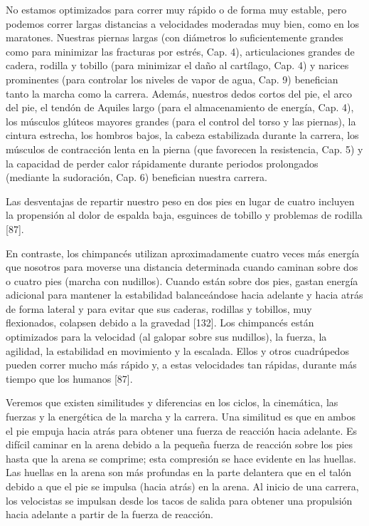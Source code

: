 \documentclass[12pt]{book}
\begin{document}
No estamos optimizados para correr muy rápido o de forma muy estable, pero podemos correr largas distancias a velocidades moderadas muy bien, como en los maratones. Nuestras piernas largas (con diámetros lo suficientemente grandes como para minimizar las fracturas por estrés, Cap. 4), articulaciones grandes de cadera, rodilla y tobillo (para minimizar el daño al cartílago, Cap. 4) y narices prominentes (para controlar los niveles de vapor de agua, Cap. 9) benefician tanto la marcha como la carrera. Además, nuestros dedos cortos del pie, el arco del pie, el tendón de Aquiles largo (para el almacenamiento de energía, Cap. 4), los músculos glúteos mayores grandes (para el control del torso y las piernas), la cintura estrecha, los hombros bajos, la cabeza estabilizada durante la carrera, los músculos de contracción lenta en la pierna (que favorecen la resistencia, Cap. 5) y la capacidad de perder calor rápidamente durante periodos prolongados (mediante la sudoración, Cap. 6) benefician nuestra carrera.

Las desventajas de repartir nuestro peso en dos pies en lugar de cuatro incluyen la propensión al dolor de espalda baja, esguinces de tobillo y problemas de rodilla [87].

En contraste, los chimpancés utilizan aproximadamente cuatro veces más energía que nosotros para moverse una distancia determinada cuando caminan sobre dos o cuatro pies (marcha con nudillos). Cuando están sobre dos pies, gastan energía adicional para mantener la estabilidad balanceándose hacia adelante y hacia atrás de forma lateral y para evitar que sus caderas, rodillas y tobillos, muy flexionados, colapsen debido a la gravedad [132]. Los chimpancés están optimizados para la velocidad (al galopar sobre sus nudillos), la fuerza, la agilidad, la estabilidad en movimiento y la escalada. Ellos y otros cuadrúpedos pueden correr mucho más rápido y, a estas velocidades tan rápidas, durante más tiempo que los humanos [87].

Veremos que existen similitudes y diferencias en los ciclos, la cinemática, las fuerzas y la energética de la marcha y la carrera. Una similitud es que en ambos el pie empuja hacia atrás para obtener una fuerza de reacción hacia adelante. Es difícil caminar en la arena debido a la pequeña fuerza de reacción sobre los pies hasta que la arena se comprime; esta compresión se hace evidente en las huellas. Las huellas en la arena son más profundas en la parte delantera que en el talón debido a que el pie se impulsa (hacia atrás) en la arena. Al inicio de una carrera, los velocistas se impulsan desde los tacos de salida para obtener una propulsión hacia adelante a partir de la fuerza de reacción.
\end{document}
